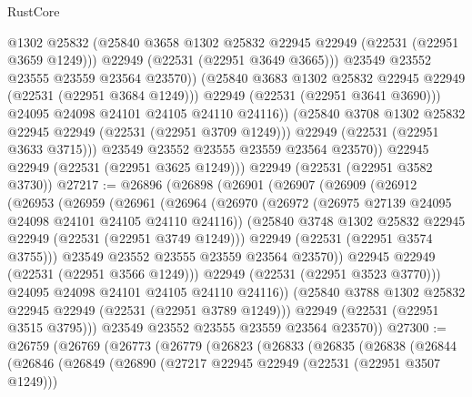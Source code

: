 \begin{lexlean}{RustCore}
\begin{coremodule}
                        @1302
                        @25832
                        (@25840 @3658 @1302 @25832 @22945 @22949 (@22531 (@22951 @3659 @1249)))
                        @22949
                        (@22531 (@22951 @3649 @3665)))
                      @23549
                      @23552
                      @23555
                      @23559
                      @23564
                      @23570))
                  (@25840 @3683 @1302 @25832 @22945 @22949 (@22531 (@22951 @3684 @1249)))
                  @22949
                  (@22531 (@22951 @3641 @3690)))
                @24095
                @24098
                @24101
                @24105
                @24110
                @24116))
            (@25840 @3708 @1302 @25832 @22945 @22949 (@22531 (@22951 @3709 @1249)))
            @22949
            (@22531 (@22951 @3633 @3715)))
          @23549
          @23552
          @23555
          @23559
          @23564
          @23570))
      @22945
      @22949
      (@22531 (@22951 @3625 @1249)))
    @22949
    (@22531 (@22951 @3582 @3730))
@27217 := @26896
    (@26898
      (@26901
        (@26907
          (@26909
            (@26912
              (@26953
                (@26959
                  (@26961
                    (@26964
                      (@26970
                        (@26972 (@26975 @27139 @24095 @24098 @24101 @24105 @24110 @24116))
                        (@25840 @3748 @1302 @25832 @22945 @22949 (@22531 (@22951 @3749 @1249)))
                        @22949
                        (@22531 (@22951 @3574 @3755)))
                      @23549
                      @23552
                      @23555
                      @23559
                      @23564
                      @23570))
                  @22945
                  @22949
                  (@22531 (@22951 @3566 @1249)))
                @22949
                (@22531 (@22951 @3523 @3770)))
              @24095
              @24098
              @24101
              @24105
              @24110
              @24116))
          (@25840 @3788 @1302 @25832 @22945 @22949 (@22531 (@22951 @3789 @1249)))
          @22949
          (@22531 (@22951 @3515 @3795)))
        @23549
        @23552
        @23555
        @23559
        @23564
        @23570))
@27300 := @26759
    (@26769
      (@26773
        (@26779
          (@26823
            (@26833
              (@26835
                (@26838
                  (@26844
                    (@26846
                      (@26849
                        (@26890
                          (@27217 @22945 @22949 (@22531 (@22951 @3507 @1249)))

\end{coremodule}
\end{lexlean}
